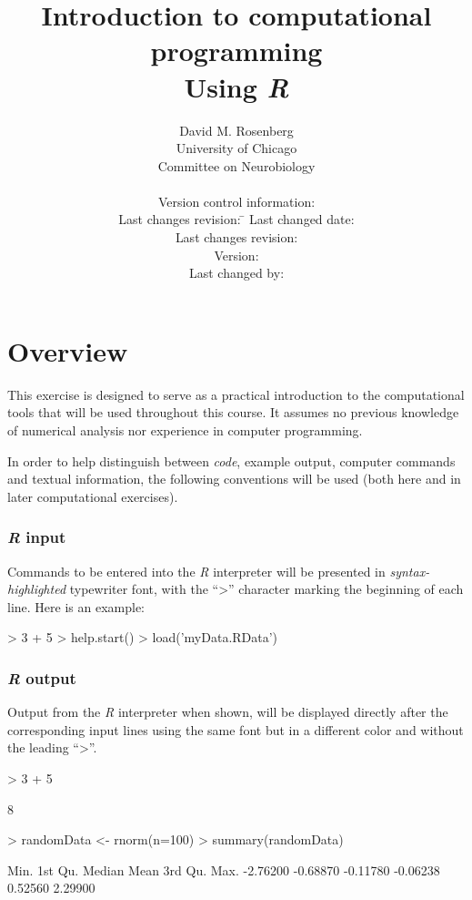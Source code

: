 \documentclass[10pt,letterpaper]{article}
\title{Introduction to computational programming\\\smaller Using \emph{R}}
\author{David M. Rosenberg\\\small University of Chicago\\\small Committee on Neurobiology\medskip\\
{\footnotesize \parbox[t]{10cm} {
Version control information:
\begin{tabbing}
\footnotesize\sffamily
 Last changes revision: \= \kill
 Last changed date: \> \svndate\\
 Last changes revision: \> \svnrev\\
 Version: \> \svnFullRevision*{\svnrev}\\
 Last changed by: \> \svnFullAuthor*{\svnauthor}\\
\end{tabbing}
}
}}
\newenvironment{Schunk}{}{}
\begin{document}
\maketitle

\section*{Overview}

This exercise is designed to serve as a practical introduction to the computational tools that will be used throughout this course.  It assumes no previous knowledge of numerical analysis nor experience in computer programming.

In order to help distinguish between \emph{code}, example output, computer commands and textual information, the following conventions will be used (both here and in later computational exercises).

\subsubsection*{\emph{R} input}

Commands to be entered into the \emph{R} interpreter will be presented in \emph{syntax-highlighted} typewriter font, with the ``>'' character marking the beginning of each line.  Here is an example:

\begin{Schunk}
\begin{Sinput}
> 3 + 5
> help.start()
> load('myData.RData')
\end{Sinput}
\end{Schunk}

\subsubsection*{\emph{R} output}

Output from the \emph{R} interpreter when shown, will be displayed directly after the corresponding input lines using the same font but in a different color and without the leading ``>''.

\begin{Schunk}
\begin{Sinput}
> 3 + 5
\end{Sinput}
\begin{Soutput}
[1] 8
\end{Soutput}
\begin{Sinput}
> randomData <- rnorm(n=100)
> summary(randomData)
\end{Sinput}
\begin{Soutput}
    Min.  1st Qu.   Median     Mean  3rd Qu.     Max. 
-2.76200 -0.68870 -0.11780 -0.06238  0.52560  2.29900 
\end{Soutput}
\end{Schunk}
\end{document}
